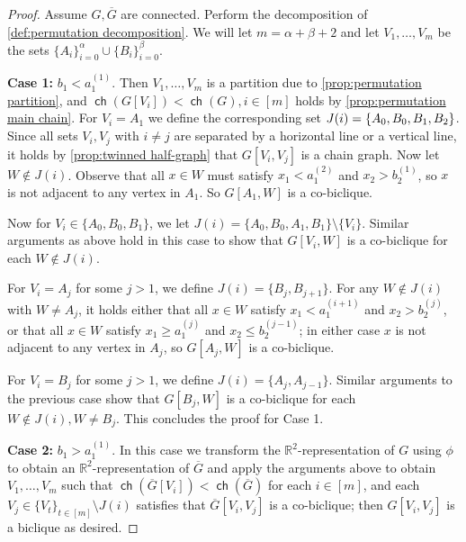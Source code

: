\documentclass{theoretics}
\newcommand{\bR}{\ensuremath{\mathbb{R}}}
\newcommand\splitaftercomma[1]{%
  \begingroup
  \begingroup\lccode`~=`, \lowercase{\endgroup
    \edef~{\mathchar\the\mathcode`, \penalty0 \noexpand\hspace{0pt plus .25em}}%
  }\mathcode`,="8000 #1%
  \endgroup
}
\DeclareMathOperator\ch{\mathsf{ch}}
\begin{document}
\begin{proof}
	Assume $G,\overline G$ are connected. Perform the decomposition of \cref{def:permutation
		decomposition}. We will let $m = \alpha+\beta+2$ and let $V_1, \dotsc, V_m$ be the sets
	$\{A_i\}_{i=0}^\alpha \cup \{B_i\}_{i=0}^\beta$.
	
	\textbf{Case 1:} $b_1 < a^{(1)}_1$. Then $V_1, \dotsc, V_m$ is a partition due to
	\cref{prop:permutation partition}, and $\ch(G[V_i]) < \ch(G), i \in [m]$ holds by \cref{prop:permutation main
		chain}. For $V_i = A_1$ we define the corresponding set $J(i) = \splitaftercomma{\{ A_0, B_0, B_1, B_2\}}$. Since all
	sets $V_i,V_j$ with $i \neq j$ are separated by a horizontal line or a vertical line, it holds by
	\cref{prop:twinned half-graph} that $G[V_i,V_j]$ is a chain graph. Now let $W \notin J(i)$.
	Observe that all $x \in W$ must satisfy $x_1 < a^{(2)}_1$ and $x_2 > b^{(1)}_2$, so $x$ is not
	adjacent to any vertex in $A_1$. So $G[A_1,W]$ is a co-biclique.
	
	Now for $V_i \in \{A_0, B_0, B_1\}$, we let $J(i) = \{ A_0, B_0, A_1, B_1\} \setminus \{V_i\}$. Similar
	arguments as above hold in this case to show that $G[V_i,W]$ is a co-biclique for each
	$W \notin J(i)$.
	
	For $V_i = A_j$ for some $j > 1$, we define $J(i) = \{ B_j, B_{j+1} \}$. For any $W \notin J(i)$
	with $W \neq A_j$, it holds either that all $x \in W$ satisfy $x_1 < a^{(i+1)}_1$ and $x_2 >
	b^{(j)}_2$, or that all $x \in W$ satisfy $x_1 \geq a^{(j)}_1$ and $x_2 \leq b^{(j-1)}_2$; in either
	case $x$ is not adjacent to any vertex in $A_j$, so $G[A_j,W]$ is a co-biclique.
	
	For $V_i = B_j$ for some $j > 1$, we define $J(i) = \{ A_j, A_{j-1} \}$. Similar arguments to the
	previous case show that $G[B_j, W]$ is a co-biclique for each $W \notin J(i), W \neq B_j$. This
	concludes the proof for Case 1.
	
	\textbf{Case 2:} $b_1 > a^{(1)}_1$. In this case we transform the $\bR^2$-representation of $G$
	using $\phi$ to obtain an $\bR^2$-representation of $\overline G$ and apply the arguments above to
	obtain $V_1, \dotsc, V_m$ such that $\ch(\overline G[V_i]) < \ch(\overline G)$ for each $i \in [m]$,
	and each $V_j \in \{V_t\}_{t \in [m]} \setminus J(i)$ satisfies that $\overline{G}[V_i,V_j]$ is a
	co-biclique; then $G[V_i,V_j]$ is a biclique as desired.
\end{proof}
\end{document}
